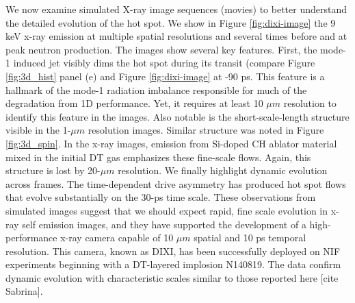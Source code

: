 \documentclass[aip,pop,numerical,reprint,floatfix]{revtex4-1}
\begin{document}
We now examine simulated X-ray image sequences (movies) to better
understand the detailed evolution of the hot spot. We show in Figure \ref{fig:dixi-image}
the 9 keV x-ray emission at multiple spatial resolutions and several
times before and at peak neutron production. The images show several
key features. First, the mode-1 induced jet visibly dims the hot spot
during its transit (compare Figure \ref{fig:3d_hist} panel (e) and Figure \ref{fig:dixi-image}
at -90 ps. This feature is a hallmark of the mode-1 radiation imbalance
responsible for much of the degradation from 1D performance. Yet,
it requires at least 10 $\mu m$ resolution to identify this feature
in the images. Also notable is the short-scale-length structure visible
in the 1-$\mu m$ resolution images. Similar structure was noted in
Figure \ref{fig:3d_spin}. In the x-ray images, emission from Si-doped CH
ablator material mixed in the initial DT gas emphasizes these fine-scale
flows. Again, this structure is lost by 20-$\mu m$ resolution. We
finally highlight dynamic evolution across frames. The time-dependent
drive asymmetry has produced hot spot flows that evolve substantially
on the 30-ps time scale. These observations from simulated images
suggest that we should expect rapid, fine scale evolution in x-ray
self emission images, and they have supported the development of a
high-performance x-ray camera capable of 10 $\mu m$ spatial and 10
ps temporal resolution. This camera, known as DIXI, has been successfully
deployed on NIF experiments beginning with a DT-layered implosion
N140819. The data confirm dynamic evolution with characteristic scales
similar to those reported here {[}cite Sabrina{]}. 
\end{document}
